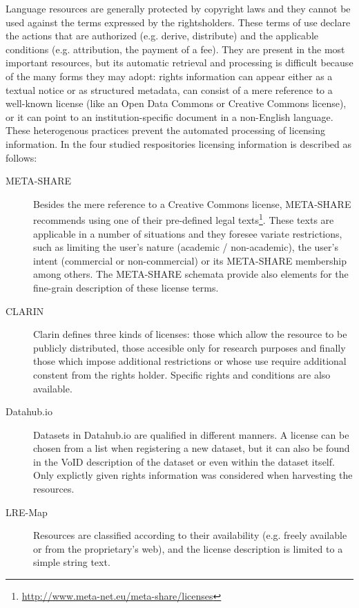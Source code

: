 \documentclass[11pt]{article}
\begin{document}
Language resources are generally protected by copyright laws and they cannot be used against the terms expressed by the rightsholders. These terms of use declare the actions that are authorized (e.g. derive, distribute) and the applicable conditions (e.g. attribution, the payment of a fee). They are present in the most important resources, but its automatic retrieval and processing is difficult because of the many forms they may adopt: rights information can appear either as a textual notice or as structured metadata, can consist of a mere reference to a well-known license (like an Open Data Commons or Creative Commons license), or it can point to an institution-specific document in a non-English language. These heterogenous practices prevent the automated processing of licensing information. In the four studied respositories licensing information is described as follows:
\begin{description}
	\item[META-SHARE] Besides the mere reference to a Creative Commons license, META-SHARE recommends using one of their pre-defined legal texts\footnote{\url{http://www.meta-net.eu/meta-share/licenses} }. These texts are applicable in a number of situations and they foresee variate restrictions, such as limiting the user's nature (academic / non-academic), the user's intent (commercial or non-commercial) or its META-SHARE membership among others. The META-SHARE schemata provide also elements for the fine-grain description of these license terms.
	\item[CLARIN] Clarin defines three kinds of licenses: those which allow the resource to be publicly distributed, those accesible only for research purposes and finally those which impose additional restrictions or whose use require additional constent from the rights holder. Specific rights and conditions are also available.
	\item[Datahub.io] Datasets in Datahub.io are qualified in different manners. A license can be chosen from a list when registering a new dataset, but it can also be found in the VoID description of the dataset or even within the dataset itself. Only explictly given rights information was considered when harvesting the resources.
  \item[LRE-Map] Resources are classified according to their availability (e.g. freely available or from the proprietary's web), and the license description is limited to a simple string text.
\end{description}
\end{document}
